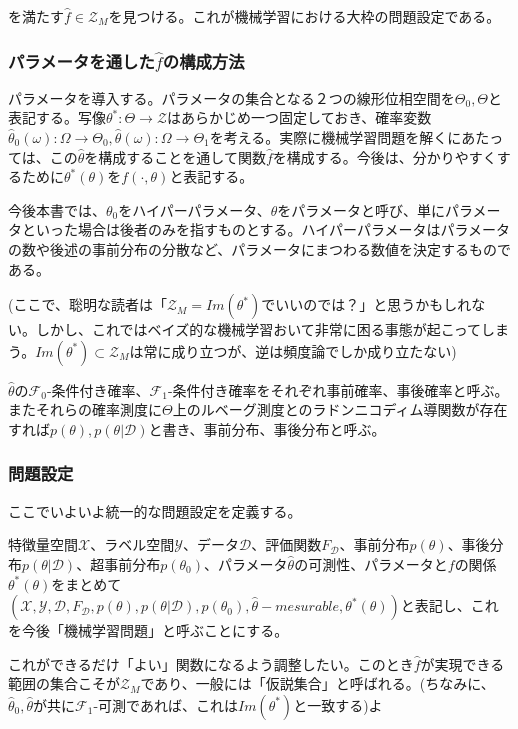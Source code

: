 \documentclass[dvipdfmx, a4paper]{jsarticle}
\begin{document}
を満たす$\hat{f}\in \mathcal{Z}_M$を見つける。これが機械学習における大枠の問題設定である。

\subsubsection{パラメータを通した$\hat{f}$の構成方法}
パラメータを導入する。パラメータの集合となる２つの線形位相空間を$\Theta_0,\Theta$と表記する。写像$\theta^*:\Theta\to\mathcal{Z}$はあらかじめ一つ固定しておき、確率変数$\hat{\theta}_0(\omega)\colon\Omega\to\Theta_0,\hat{\theta}(\omega)\colon\Omega\to\Theta_1$を考える。実際に機械学習問題を解くにあたっては、この$\hat{\theta}$を構成することを通して関数$\hat{f}$を構成する。今後は、分かりやすくするために$\theta^*(\theta)$を$f(\cdot,\theta)$と表記する。

今後本書では、$\theta_0$をハイパーパラメータ、$\theta$をパラメータと呼び、単にパラメータといった場合は後者のみを指すものとする。ハイパーパラメータはパラメータの数や後述の事前分布の分散など、パラメータにまつわる数値を決定するものである。

(ここで、聡明な読者は「$\mathcal{Z}_M=Im(\theta^*)$でいいのでは？」と思うかもしれない。しかし、これではベイズ的な機械学習おいて非常に困る事態が起こってしまう。$Im(\theta^*)\subset\mathcal{Z}_M$は常に成り立つが、逆は頻度論でしか成り立たない)

$\hat{\theta}$の$\mathcal{F}_0$-条件付き確率、$\mathcal{F}_1$-条件付き確率をそれぞれ事前確率、事後確率と呼ぶ。またそれらの確率測度に$\Theta$上のルベーグ測度とのラドンニコディム導関数が存在すれば$p(\theta),p(\theta|\mathcal{D})$と書き、事前分布、事後分布と呼ぶ。

\subsubsection{問題設定}
ここでいよいよ統一的な問題設定を定義する。

特徴量空間$\mathcal{X}$、ラベル空間$\mathcal{Y}$、データ$\mathcal{D}$、評価関数$F_\mathcal{D}$、事前分布$p(\theta)$、事後分布$p(\theta|\mathcal{D})$、超事前分布$p(\theta_0)
$、パラメータ$\hat{\theta}$の可測性、パラメータと$f$の関係$\theta^*(\theta)$をまとめて$(\mathcal{X},\mathcal{Y},\mathcal{D},F_\mathcal{D},p(\theta),p(\theta|\mathcal{D}),p(\theta_0),\hat{\theta}-mesurable,\theta^*(\theta))$と表記し、これを今後「機械学習問題」と呼ぶことにする。

これができるだけ「よい」関数になるよう調整したい。このとき$\hat{f}$が実現できる範囲の集合こそが$\mathcal{Z}_M$であり、一般には「仮説集合」と呼ばれる。(ちなみに、$\hat{\theta}_0,\hat{\theta}$が共に$\mathcal{F}_1$-可測であれば、これは$Im(\theta^*)$と一致する)よ
\end{document}
